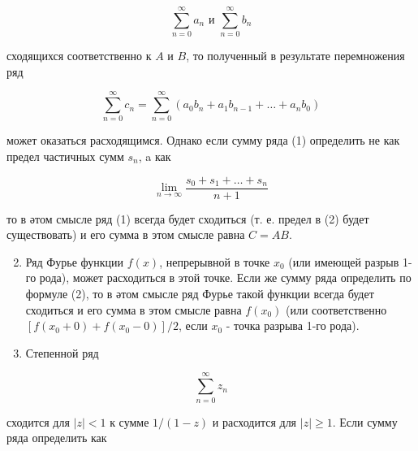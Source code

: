 \documentclass[10pt]{article}
\begin{document}
\[

\sum_{n=0}^{\infty} a_{n} \text { и } \sum_{n=0}^{\infty} b_{n}

\]



сходящихся соответственно к $A$ и $B$, то полученный в результате перемножения ряд



\[

\sum_{n=0}^{\infty} c_{n}=\sum_{n=0}^{\infty}\left(a_{0} b_{n}+a_{1} b_{n-1}+\ldots+a_{n} b_{0}\right)

\]



может оказаться расходящимся. Однако если сумму ряда (1) определить не как предел частичных сумм $s_{n}$, a как



\[

\lim _{n \rightarrow \infty} \frac{s_{0}+s_{1}+\ldots+s_{n}}{n+1}

\]



то в әтом смысле ряд (1) всегда будет сходиться (т. е. предел в (2) будет существовать) и его сумма в этом смысле равна $C=A B$.



\begin{enumerate}

  \setcounter{enumi}{1}

  \item Ряд Фурье функции $f(x)$, непрерывной в точке $x_{0}$ (или имеющей разрыв 1-го рода), может расходиться в этой точке. Если же сумму ряда определить по формуле (2), то в әтом смысле ряд Фурье такой функции всегда будет сходиться и его сумма в этом смысле равна $f\left(x_{0}\right)$ (или соответственно $\left[f\left(x_{0}+0\right)+f\left(x_{0}-0\right)\right] / 2$, если $x_{0}$ - точка разрыва 1-го рода).



  \item Степенной ряд



\end{enumerate}



\[

\sum_{n=0}^{\infty} z_{n}

\]



сходится для $|z|<1$ к сумме $1 /(1-z)$ и расходится для $|z| \geqslant 1$. Если сумму ряда определить как
\end{document}
